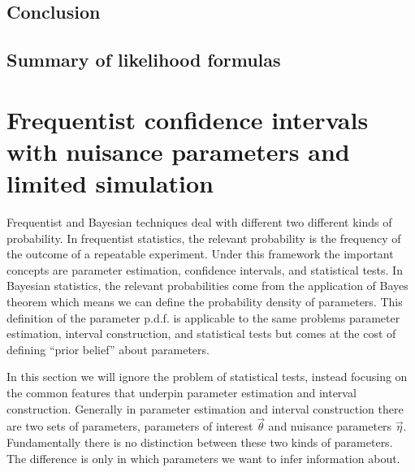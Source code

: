 \subsection{Conclusion\label{sec:llhconclusion}}
\begingroup
\graphicspath{{results/mcllh_paper/}}

\endgroup

\subsection{Summary of likelihood formulas\label{sec:llhtable}}
\begingroup
\graphicspath{{results/mcllh_paper/}}

\endgroup
\FloatBarrier
\section{Frequentist confidence intervals with nuisance parameters and limited simulation}\label{sec:low_stats_confidence_intervals}

Frequentist and Bayesian techniques deal with different two different kinds of probability.
In frequentist statistics, the relevant probability is the frequency of the outcome of a repeatable experiment.
Under this framework the important concepts are parameter estimation, confidence intervals, and statistical tests.
In Bayesian statistics, the relevant probabilities come from the application of Bayes theorem which means we can define the probability density of parameters.
This definition of the parameter p.d.f. is applicable to the same problems parameter estimation, interval construction, and statistical tests but comes at the cost of defining ``prior belief'' about parameters.

In this section we will ignore the problem of statistical tests, instead focusing on the common features that underpin parameter estimation and interval construction.
Generally in parameter estimation and interval construction there are two sets of parameters, parameters of interest $\vec\theta$ and nuisance parameters $\vec\eta$.
Fundamentally there is no distinction between these two kinds of parameters.
The difference is only in which parameters we want to infer information about.


